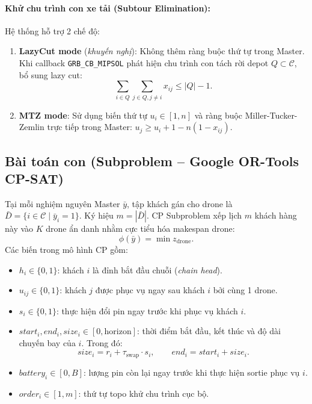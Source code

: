 \documentclass[12pt,a4paper]{article}
\newcommand{\C}{\mathcal{C}}
\newcommand{\swap}{\tau_{\mathrm{swap}}}
\begin{document}
\paragraph{Khử chu trình con xe tải (Subtour Elimination):}
Hệ thống hỗ trợ 2 chế độ:
\begin{enumerate}[leftmargin=2em]
    \item \textbf{LazyCut mode} (\emph{khuyến nghị}): Không thêm ràng buộc thứ tự trong Master. Khi callback \texttt{GRB\_CB\_MIPSOL} phát hiện chu trình con tách rời depot $Q \subset \C$, bổ sung lazy cut:
    \begin{equation}
        \sum_{i \in Q} \sum_{j \in Q, j \neq i} x_{ij} \le |Q| - 1.
        \label{eq:subtour-cut}
    \end{equation}
    \item \textbf{MTZ mode}: Sử dụng biến thứ tự $u_i \in [1, n]$ và ràng buộc Miller-Tucker-Zemlin trực tiếp trong Master: $u_j \ge u_i + 1 - n(1 - x_{ij})$.
\end{enumerate}

\subsection{Bài toán con (Subproblem -- Google OR-Tools CP-SAT)}

Tại mỗi nghiệm nguyên Master $\bar{y}$, tập khách gán cho drone là $\bar{D} = \{i \in \C \mid \bar{y}_i = 1\}$. Ký hiệu $m = |\bar{D}|$. CP Subproblem xếp lịch $m$ khách hàng này vào $K$ drone ẩn danh nhằm cực tiểu hóa makespan drone:
\[
    \phi(\bar{y}) = \min z_{\mathrm{drone}}.
\]
Các biến trong mô hình CP gồm:
\begin{itemize}[leftmargin=2em]
    \item $h_i \in \{0, 1\}$: khách $i$ là đỉnh bắt đầu chuỗi (\emph{chain head}).
    \item $u_{ij} \in \{0, 1\}$: khách $j$ được phục vụ ngay sau khách $i$ bởi cùng 1 drone.
    \item $s_i \in \{0, 1\}$: thực hiện đổi pin ngay trước khi phục vụ khách $i$.
    \item $start_i, end_i, size_i \in [0, \text{horizon}]$: thời điểm bắt đầu, kết thúc và độ dài chuyến bay của $i$. Trong đó:
    \begin{equation}
        size_i = r_i + \swap \cdot s_i, \qquad end_i = start_i + size_i.
    \end{equation}
    \item $battery_i \in [0, B]$: lượng pin còn lại ngay trước khi thực hiện sortie phục vụ $i$.
    \item $order_i \in [1, m]$: thứ tự topo khử chu trình cục bộ.
\end{itemize}
\end{document}
